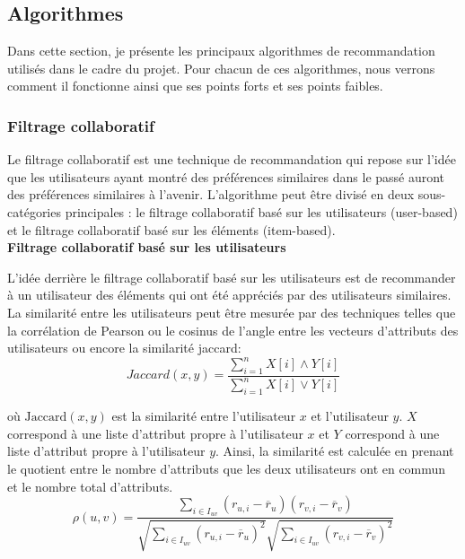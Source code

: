 \documentclass[11pt]{article}
\begin{document}
\subsection{Algorithmes}
\label{2.2}
Dans cette section, je présente les principaux algorithmes de recommandation utilisés dans le cadre du projet. Pour chacun de ces algorithmes, nous verrons comment il fonctionne ainsi que ses points forts et ses points faibles.
\subsubsection{Filtrage collaboratif}
Le filtrage collaboratif \cite{anandhan2018social} est une technique de recommandation qui repose sur l'idée que les utilisateurs ayant montré des préférences similaires dans le passé auront des préférences similaires à l'avenir. L'algorithme peut être divisé en deux sous-catégories principales : le filtrage collaboratif basé sur les utilisateurs (user-based) et le filtrage collaboratif basé sur les éléments (item-based).\\

\textbf{Filtrage collaboratif basé sur les utilisateurs}

L'idée derrière le filtrage collaboratif basé sur les utilisateurs est de recommander à un utilisateur des éléments qui ont été appréciés par des utilisateurs similaires. La similarité entre les utilisateurs peut être mesurée par des techniques telles que la corrélation de Pearson ou le cosinus de l'angle entre les vecteurs d'attributs des utilisateurs ou encore la similarité jaccard:
\begin{equation}
Jaccard(x, y) = \frac{\sum_{i = 1}^n X[i] \land Y[i]}{\sum_{i = 1}^n X[i] \vee Y[i]}
\end{equation}
\label{jaccard}

où $\text{Jaccard}(x, y)$ est la similarité entre l'utilisateur $x$ et l'utilisateur $y$. $X$ correspond à une liste d'attribut propre à l'utilisateur $x$ et $Y$ correspond à une liste d'attribut propre à l'utilisateur $y$. Ainsi, la similarité est calculée en prenant le quotient entre le nombre d'attributs que les deux utilisateurs ont en commun et le nombre total d'attributs.\\

\begin{equation}
\rho(u, v) = \frac{\sum_{i \in I_{uv}} (r_{u,i} - \overline{r}_u)(r_{v,i} - \overline{r}_v)}{\sqrt{\sum_{i \in I_{uv}} (r_{u,i} - \overline{r}_u)^2}\sqrt{\sum_{i \in I_{uv}} (r_{v,i} - \overline{r}_v)^2}}
\end{equation}
\end{document}
